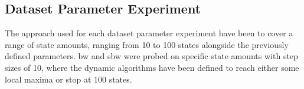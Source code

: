 \subsection{Dataset Parameter Experiment}
\label{sec:dataset_experiments}
The approach used for each dataset parameter experiment have been to cover a range of state amounts, ranging from 10 to 100 states alongside the previously defined parameters. \gls{bw} and \gls{sbw} were probed on specific state amounts with step sizes of 10, where the dynamic algorithms have been defined to reach either some local maxima or stop at 100 states.